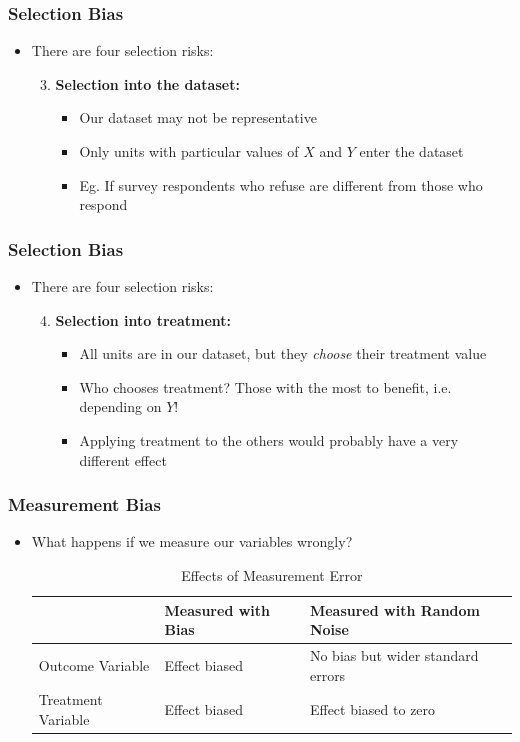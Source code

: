 \documentclass[xcolor=x11names,compress]{beamer}\usepackage[]{graphicx}\usepackage[]{color}
\renewcommand{\(}{\begin{columns}}
\renewcommand{\)}{\end{columns}}
\newcommand{\<}[1]{\begin{column}{#1}}
\renewcommand{\>}{\end{column}}
\begin{document}
\begin{frame}
\frametitle{Selection Bias}
\begin{itemize}
\item There are four selection risks:
\begin{enumerate}
\setcounter{enumi}{2}
\item \textbf{Selection into the dataset:}
\begin{itemize}
\item Our dataset may not be representative
\item Only units with particular values of $X$ and $Y$ enter the dataset
\item Eg. If survey respondents who refuse are different from those who respond
\end{itemize}
\end{enumerate}
\end{itemize}
\end{frame}

\begin{frame}
\frametitle{Selection Bias}
\begin{itemize}
\item There are four selection risks:
\begin{enumerate}
\setcounter{enumi}{3}
\item \textbf{Selection into treatment:}
\begin{itemize}
\item All units are in our dataset, but they \textit{choose} their treatment value
\item Who chooses treatment? Those with the most to benefit, i.e. depending on $Y$!
\item Applying treatment to the others would probably have a very different effect
\end{itemize}
\end{enumerate}
\end{itemize}
\end{frame}

\begin{frame}
\frametitle{Measurement Bias}
\begin{itemize}
\item What happens if we measure our variables wrongly?
\footnotesize
\begin{table}[htbp]
  \centering
  \caption{Effects of Measurement Error}
    \begin{tabular}{|l|l|p{4cm}|}
    \hline
          & Measured with Bias & Measured with Random Noise \bigstrut\\
    \hline
    Outcome Variable & Effect biased & No bias but wider standard errors \bigstrut\\
    \hline
    Treatment Variable & Effect biased & Effect biased to zero \bigstrut\\
    \hline
    \end{tabular}%
  \label{tab:addlabel}%
\end{table}%
\normalsize
\end{itemize}
\end{frame}
\end{document}
